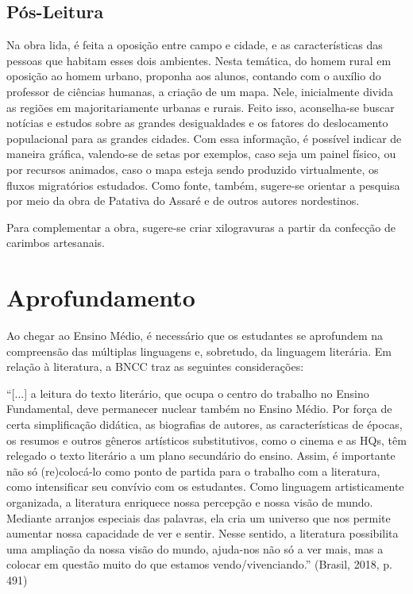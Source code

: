 \documentclass[12pt]{extarticle}
\begin{document}
\subsection{Pós-Leitura}

Na obra lida, é feita a oposição entre campo e cidade, e as
características das pessoas que habitam esses dois ambientes. Nesta
temática, do homem rural em oposição ao homem urbano, proponha aos
alunos, contando com o auxílio do professor de ciências humanas, a
criação de um mapa. Nele, inicialmente divida as regiões em
majoritariamente urbanas e rurais. Feito isso, aconselha-se buscar
notícias e estudos sobre as grandes desigualdades e os fatores do
deslocamento populacional para as grandes cidades. Com essa informação,
é possível indicar de maneira gráfica, valendo-se de setas por exemplos,
caso seja um painel físico, ou por recursos animados, caso o mapa esteja
sendo produzido virtualmente, os fluxos migratórios estudados. Como
fonte, também, sugere-se orientar a pesquisa por meio da obra de
Patativa do Assaré e de outros autores nordestinos.

Para complementar a obra, sugere-se criar xilogravuras a partir da
confecção de carimbos artesanais.


\section{Aprofundamento}

Ao chegar ao Ensino Médio, é necessário que os estudantes se aprofundem
na compreensão das múltiplas linguagens e, sobretudo, da linguagem
literária. Em relação à literatura, a BNCC traz as seguintes
considerações:

``{[}...{]} a leitura do texto literário, que ocupa o centro do trabalho
no Ensino Fundamental, deve permanecer nuclear também no Ensino Médio.
Por força de certa simplificação didática, as biografias de autores, as
características de épocas, os resumos e outros gêneros artísticos
substitutivos, como o cinema e as HQs, têm relegado o texto literário a
um plano secundário do ensino. Assim, é importante não só (re)colocá-lo
como ponto de partida para o trabalho com a literatura, como
intensificar seu convívio com os estudantes. Como linguagem
artisticamente organizada, a literatura enriquece nossa percepção e
nossa visão de mundo. Mediante arranjos especiais das palavras, ela cria
um universo que nos permite aumentar nossa capacidade de ver e sentir.
Nesse sentido, a literatura possibilita uma ampliação da nossa visão do
mundo, ajuda-nos não só a ver mais, mas a colocar em questão muito do
que estamos vendo/vivenciando.'' (Brasil, 2018, p. 491)
\end{document}
